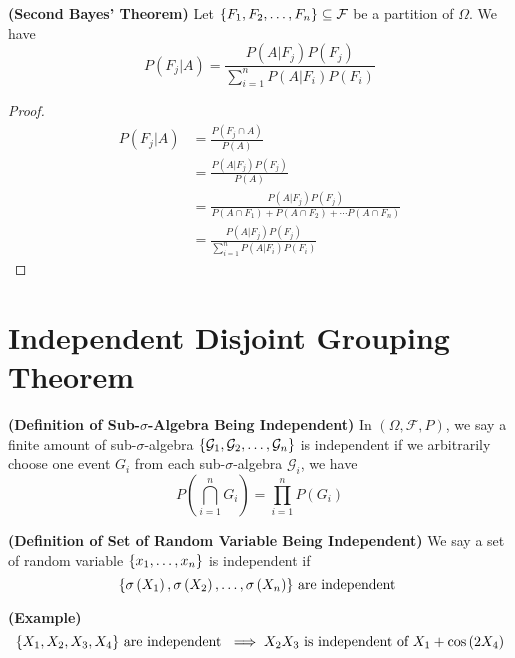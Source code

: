 \documentclass{report}
\begin{document}
\begin{theorem}
\label{3.3.3}
\textbf{(Second Bayes' Theorem)} Let $\{ F_1,F_2,\dots , F_n \}\subseteq \mathcal{F}$ be a partition of $\Omega$. We have 
\begin{equation*}
P\left(F_j|A \right)=\frac{P\left(A|F_j \right)P\left(F_j \right)}{\sum_{i=1}^n P\left(A|F_i \right)P\left(F_i \right)}
\end{equation*}
\end{theorem}
\begin{proof}
\begin{align*}
P\left(F_j|A \right)&=\frac{P\left(F_j\cap A \right)}{P\left(A \right)}\\
&=\frac{P\left(A|F_j \right)P\left(F_j \right)}{P\left(A \right)}\\
&=\frac{P\left(A|F_j \right)P\left(F_j \right)}{P\left(A\cap F_1 \right)+P\left(A\cap F_2 \right)+\cdots P\left(A\cap F_n \right)}\\
&=\frac{P\left(A|F_j \right)P\left(F_j \right)}{\sum_{i=1}^n P\left(A|F_i \right)P\left(F_i \right)}
\end{align*}
\end{proof}
\section{Independent Disjoint Grouping Theorem}
\begin{definition}
\label{3.4.1}
\textbf{(Definition of Sub-$\sigma$-Algebra Being Independent)} In $\left(\Omega,\mathcal{F},P \right)$, we say a finite amount of sub-$\sigma$-algebra $\{ \mathcal{G}_1,\mathcal{G}_2,\dots ,\mathcal{G}_n \}$ is independent if we arbitrarily choose one event $G_i$ from each sub-$\sigma$-algebra $\mathcal{G}_i$, we have
\begin{equation*}
P\left(\bigcap_{i=1}^n G_i \right)=\prod_{i=1}^n P\left(G_i \right)
\end{equation*}
\end{definition}
\begin{definition}
\label{3.4.2}
\textbf{(Definition of Set of Random Variable Being Independent)} We say a set of random variable $\{ x_1,\dots ,x_n \}$ is independent if 
\begin{equation*}
\{ \sigma \left(X_1 \right),\sigma \left(X_2 \right),\dots ,\sigma\left(X_n \right) \}\text{ are independent }
\end{equation*}
\end{definition}
\begin{theorem}
\label{3.4.3}
\textbf{(Example)}  
\begin{equation*}
\{ X_1,X_2,X_3,X_4 \}\text{ are independent }\implies X_2X_3\text{ is independent of }X_1+\cos \left(2X_4 \right)
\end{equation*}
\end{theorem}
\end{document}
